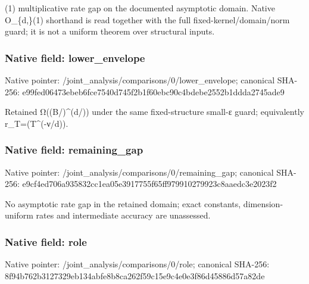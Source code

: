 \documentclass[10pt,a4paper]{article}
\begin{document}
\begingroup\raggedright{}\allowbreak{}(1) multiplicative rate gap on the documented asymptotic domain. Native O\_\allowbreak{}\{d,\allowbreak{}\}(1) shorthand is read together with the full fixed-kernel/\allowbreak{}domain/\allowbreak{}norm guard;\allowbreak{} it is not a uniform theorem over structural inputs.\par\endgroup

\subsubsection{Native field: lower\_\allowbreak{}envelope}
Native pointer: /joint\_\allowbreak{}analysis/comparisons/0/lower\_\allowbreak{}envelope; canonical SHA-256: e99fed06473ebeb6fce7540d745f2b1f60ebc90c4bdebe2552b1ddda2745ade9

\begingroup\raggedright\sloppy Retained {\AtlasUnicodeText Ω}\allowbreak{}((B/\allowbreak{})\textasciicircum{}(d/\allowbreak{})) under the same fixed-structure small-{\AtlasUnicodeText ε}\allowbreak{} guard;\allowbreak{} equivalently r\_\allowbreak{}T=\allowbreak{}(T\textasciicircum{}(-{\AtlasUnicodeText ν}\allowbreak{}/\allowbreak{}d)).\par\endgroup

\subsubsection{Native field: remaining\_\allowbreak{}gap}
Native pointer: /joint\_\allowbreak{}analysis/comparisons/0/remaining\_\allowbreak{}gap; canonical SHA-256: e9cf4ed706a935832cc1ea05e3917755f65ff979910279923c8aaedc3e2023f2

\begingroup\raggedright\sloppy No asymptotic rate gap in the retained domain;\allowbreak{} exact constants,\allowbreak{} dimension-uniform rates and intermediate accuracy are unassessed.\par\endgroup

\subsubsection{Native field: role}
Native pointer: /joint\_\allowbreak{}analysis/comparisons/0/role; canonical SHA-256: 8f94b762b3127329eb134abfe8b8ca262f59c15e9c4e0e3f86d45886d57a82de
\end{document}
